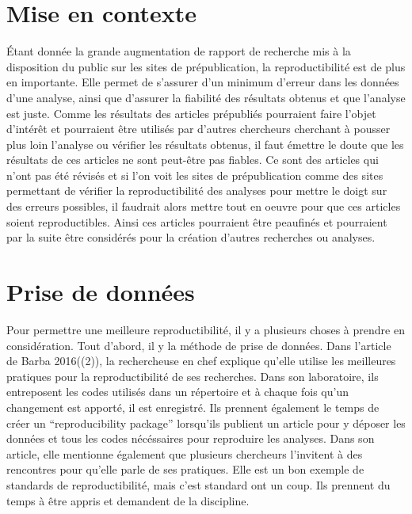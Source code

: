 \documentclass[9pt,twocolumn,twoside,]{pnas-new}
\begin{document}
\hypertarget{mise-en-contexte}{%
\section{Mise en contexte}\label{mise-en-contexte}}

Étant donnée la grande augmentation de rapport de recherche mis à la
disposition du public sur les sites de prépublication, la
reproductibilité est de plus en importante. Elle permet de s'assurer
d'un minimum d'erreur dans les données d'une analyse, ainsi que
d'assurer la fiabilité des résultats obtenus et que l'analyse est juste.
Comme les résultats des articles prépubliés pourraient faire l'objet
d'intérêt et pourraient être utilisés par d'autres chercheurs cherchant
à pousser plus loin l'analyse ou vérifier les résultats obtenus, il faut
émettre le doute que les résultats de ces articles ne sont peut-être pas
fiables. Ce sont des articles qui n'ont pas été révisés et si l'on voit
les sites de prépublication comme des sites permettant de vérifier la
reproductibilité des analyses pour mettre le doigt sur des erreurs
possibles, il faudrait alors mettre tout en oeuvre pour que ces articles
soient reproductibles. Ainsi ces articles pourraient être peaufinés et
pourraient par la suite être considérés pour la création d'autres
recherches ou analyses.

\hypertarget{prise-de-donnuxe9es}{%
\section{Prise de données}\label{prise-de-donnuxe9es}}

Pour permettre une meilleure reproductibilité, il y a plusieurs choses à
prendre en considération. Tout d'abord, il y la méthode de prise de
données. Dans l'article de Barba 2016((2)), la rechercheuse en chef
explique qu'elle utilise les meilleures pratiques pour la
reproductibilité de ses recherches. Dans son laboratoire, ils
entreposent les codes utilisés dans un répertoire et à chaque fois qu'un
changement est apporté, il est enregistré. Ils prennent également le
temps de créer un ``reproducibility package'' lorsqu'ils publient un
article pour y déposer les données et tous les codes nécéssaires pour
reproduire les analyses. Dans son article, elle mentionne également que
plusieurs chercheurs l'invitent à des rencontres pour qu'elle parle de
ses pratiques. Elle est un bon exemple de standards de reproductibilité,
mais c'est standard ont un coup. Ils prennent du temps à être appris et
demandent de la discipline.
\end{document}
